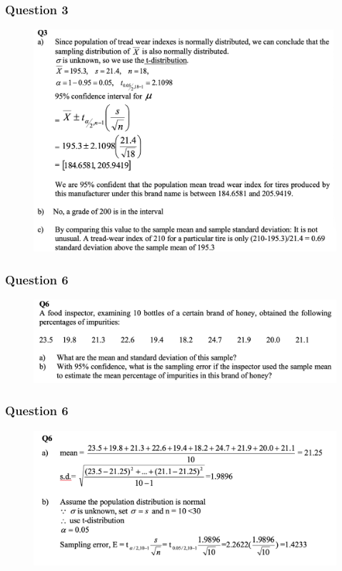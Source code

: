 \documentclass{beamer}
\begin{document}
\begin{frame}
\frametitle{Question 3}

\begin{figure}
	\begin{center}
		\includegraphics[scale=0.25]{Q3_sol.png}
	\end{center}
\end{figure}
\end{frame}
\begin{frame}
\frametitle{Question 6}

\begin{figure}
	\begin{center}
		\includegraphics[scale=0.30]{Q6.png}
	\end{center}
\end{figure}
\end{frame}
\begin{frame}
\frametitle{Question 6}
\begin{figure}
\begin{center}
	\includegraphics[scale=0.30]{Q6_sol.png}
\end{center}
\end{figure}
\end{frame}
\end{document}
